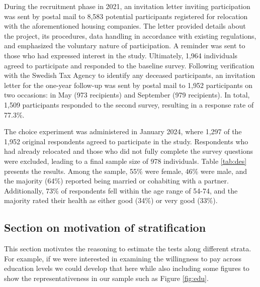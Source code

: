\documentclass[3p,12pt ]{elsarticle}
\begin{document}
During the recruitment phase in 2021, an invitation letter inviting participation was sent by postal mail to 8,583 potential participants registered for relocation with the aforementioned housing companies.
The letter provided details about the project, its procedures, data handling in accordance with existing regulations, and emphasized the voluntary nature of participation.
A reminder was sent to those who had expressed interest in the study. Ultimately, 1,964 individuals agreed to participate and responded to the baseline survey. Following verification with the Swedish Tax Agency to identify any deceased participants, an invitation letter for the one-year follow-up was sent by postal mail to 1,952 participants on two occasions: in May (973 recipients) and September (979 recipients). In total, 1,509 participants responded to the second survey, resulting in a response rate of 77.3\%.




The choice experiment was administered in January 2024,
where 1,297 of the 1,952 original respondents agreed to participate in the study.
Respondents who had already relocated and those who did not fully complete the survey questions were excluded, leading to a final sample size of 978 individuals.
Table \ref{tab:des} presents the results.
Among the sample, 55\% were female, 46\% were male, and the majority (64\%) reported being married or cohabiting with a partner. Additionally, 73\% of respondents fell within the age range of 54-74, and the majority rated their health as either good (34\%) or very good (33\%).

\begin{table}




\end{table}

\clearpage

\subsection{Section on motivation of stratification}

This section motivates the reasoning to estimate the tests along different strata.
For example,
if we were interested in examining the willingness to pay across education levels we could develop that here while also including some figures to show the representativeness in our sample such as Figure \ref{fig:edu}.
\end{document}
